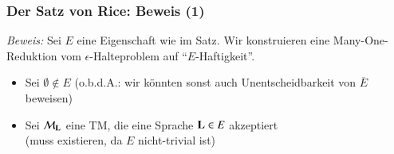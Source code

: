 \documentclass[onlymath]{beamer}
\begin{document}
\begin{frame}[t]\frametitle{Der Satz von Rice: Beweis (1)}


\emph{Beweis:} Sei $E$ eine Eigenschaft wie im Satz. Wir konstruieren eine
Many-One-Reduktion vom $\epsilon$-Halteproblem auf "`$E$-Haftigkeit"'.\bigskip

\begin{itemize}
\item Sei $\emptyset\notin E$ 
	(o.b.d.A.: wir könnten sonst auch Unentscheidbarkeit von $\overline{E}$ beweisen)
\item Sei $\mathcal{M}_{\textbf{\textcolor{black}{L}}}$ eine TM, die eine Sprache $\textbf{\textcolor{black}{L}}\in E$ akzeptiert\\
	(muss existieren, da $E$ nicht-trivial ist)
\end{itemize}

\end{frame}
\end{document}
